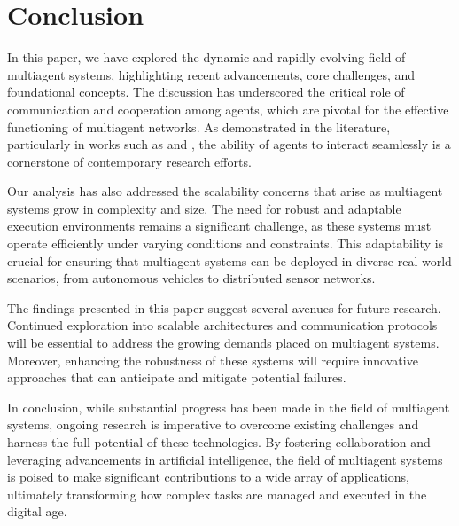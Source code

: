 \section{Conclusion}

In this paper, we have explored the dynamic and rapidly evolving field of multiagent systems, highlighting recent advancements, core challenges, and foundational concepts. The discussion has underscored the critical role of communication and cooperation among agents, which are pivotal for the effective functioning of multiagent networks. As demonstrated in the literature, particularly in works such as \cite{scaling_rules} and \cite{cooperative_ai}, the ability of agents to interact seamlessly is a cornerstone of contemporary research efforts.

Our analysis has also addressed the scalability concerns that arise as multiagent systems grow in complexity and size. The need for robust and adaptable execution environments remains a significant challenge, as these systems must operate efficiently under varying conditions and constraints. This adaptability is crucial for ensuring that multiagent systems can be deployed in diverse real-world scenarios, from autonomous vehicles to distributed sensor networks.

The findings presented in this paper suggest several avenues for future research. Continued exploration into scalable architectures and communication protocols will be essential to address the growing demands placed on multiagent systems. Moreover, enhancing the robustness of these systems will require innovative approaches that can anticipate and mitigate potential failures.

In conclusion, while substantial progress has been made in the field of multiagent systems, ongoing research is imperative to overcome existing challenges and harness the full potential of these technologies. By fostering collaboration and leveraging advancements in artificial intelligence, the field of multiagent systems is poised to make significant contributions to a wide array of applications, ultimately transforming how complex tasks are managed and executed in the digital age.